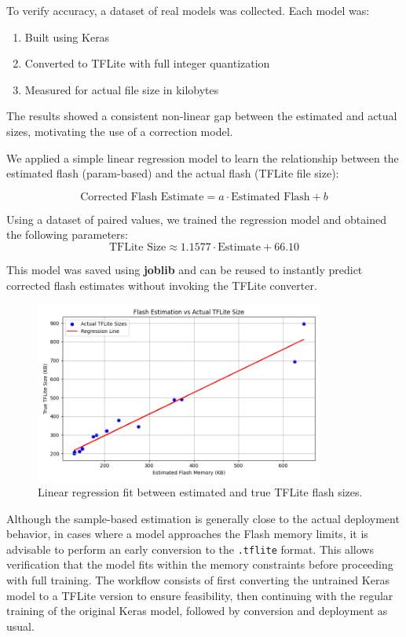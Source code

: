 To verify accuracy, a dataset of real models was collected. Each model was:
\begin{enumerate}
    \item Built using Keras
    \item Converted to TFLite with full integer quantization
    \item Measured for actual file size in kilobytes
\end{enumerate}

The results showed a consistent non-linear gap between the estimated and actual sizes, motivating the use of a correction model.

We applied a simple linear regression model to learn the relationship between the estimated flash (param-based) and the actual flash (TFLite file size):

\[
\text{Corrected Flash Estimate} = a \cdot \text{Estimated Flash} + b
\]

Using a dataset of paired values, we trained the regression model and obtained the following parameters:
\[
\text{TFLite Size} \approx 1.1577 \cdot \text{Estimate} + 66.10
\]

 This model was saved using \textbf{joblib} and can be reused to instantly predict corrected flash estimates without invoking the TFLite converter.

 \begin{figure}[h]
  \centering
  \includegraphics[width=0.85\textwidth]{Pictures/flash_regression_plot.png}
  \caption{Linear regression fit between estimated and true TFLite flash sizes.}
  \label{fig:flash-regression}
\end{figure}


Although the sample-based estimation is generally close to the actual deployment behavior, in cases where a model approaches the Flash memory limits, it is advisable to perform an early conversion to the \texttt{.tflite} format. This allows verification that the model fits within the memory constraints before proceeding with full training. The workflow consists of first converting the untrained Keras model to a TFLite version to ensure feasibility, then continuing with the regular training of the original Keras model, followed by conversion and deployment as usual.

